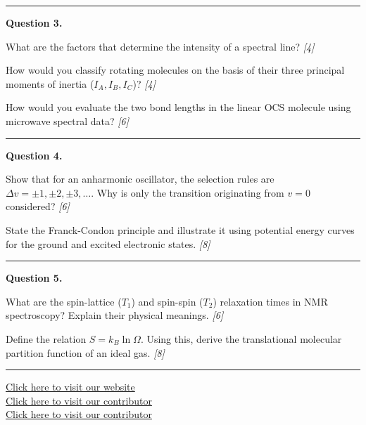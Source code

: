 \documentclass[11pt,a4paper]{article}
\newcommand{\pts}[1]{\hfill   \textit{[#1]}}
\begin{document}
\medskip\rule{\linewidth}{0.2pt}




\noindent   \textbf{Question 3.}

\begin{parts}
  \item What are the factors that determine the intensity of a spectral line? \pts{4}
  \item How would you classify rotating molecules on the basis of their three principal moments of inertia ($I_A, I_B, I_C$)? \pts{4}
  \item How would you evaluate the two bond lengths in the linear $ \text{OCS}$ molecule using microwave spectral data? \pts{6}
\end{parts}

\medskip\rule{\linewidth}{0.2pt}




\noindent   \textbf{Question 4.}

\begin{parts}
  \item Show that for an anharmonic oscillator, the selection rules are $\Delta v = \pm1, \pm2, \pm3, \dots$. Why is only the transition originating from $v=0$ considered? \pts{6}
  \item State the Franck-Condon principle and illustrate it using potential energy curves for the ground and excited electronic states. \pts{8}
\end{parts}

\medskip\rule{\linewidth}{0.2pt}




\noindent   \textbf{Question 5.}

\begin{parts}
  \item What are the spin-lattice ($T_1$) and spin-spin ($T_2$) relaxation times in NMR spectroscopy? Explain their physical meanings. \pts{6}
  \item Define the relation $S = k_B \ln \Omega$. Using this, derive the translational molecular partition function of an ideal gas. \pts{8}
\end{parts}

\vfill
\rule{\linewidth}{0.4pt}

\begin{center}\small
  \href{https://bhu-exam.vercel.app/}{Click here to visit our website}\\[4pt]
  \href{https://me-aryan.vercel.app/}{Click here to visit our contributor}\\[4pt]
  \href{https://quashan-me.vercel.app/}{Click here to visit our contributor}
\end{center}
\end{document}
